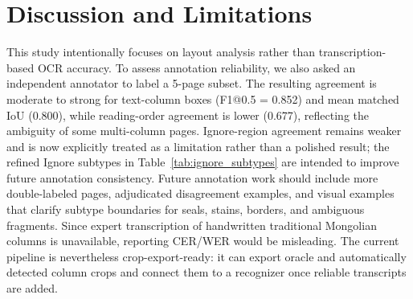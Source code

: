 \documentclass[12pt]{article}
\begin{document}
\section{Discussion and Limitations}
\label{sec:discussion}
This study intentionally focuses on layout analysis rather than transcription-based OCR accuracy. To assess annotation reliability, we also asked an independent annotator to label a 5-page subset. The resulting agreement is moderate to strong for text-column boxes (F1@0.5 = 0.852) and mean matched IoU (0.800), while reading-order agreement is lower (0.677), reflecting the ambiguity of some multi-column pages. Ignore-region agreement remains weaker and is now explicitly treated as a limitation rather than a polished result; the refined Ignore subtypes in Table~\ref{tab:ignore_subtypes} are intended to improve future annotation consistency. Future annotation work should include more double-labeled pages, adjudicated disagreement examples, and visual examples that clarify subtype boundaries for seals, stains, borders, and ambiguous fragments. Since expert transcription of handwritten traditional Mongolian columns is unavailable, reporting CER/WER would be misleading. The current pipeline is nevertheless crop-export-ready: it can export oracle and automatically detected column crops and connect them to a recognizer once reliable transcripts are added.
\end{document}
